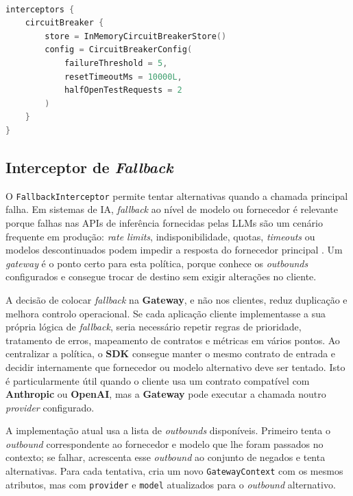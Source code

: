     \vspace{0.5em}
    \begin{lstlisting}[language=kotlin, caption={DSL de configuração do \textit{interceptor} de \textit{circuit breaker}}]

interceptors {
    circuitBreaker {
        store = InMemoryCircuitBreakerStore()
        config = CircuitBreakerConfig(
            failureThreshold = 5,
            resetTimeoutMs = 10000L,
            halfOpenTestRequests = 2
        )
    }
}
    \end{lstlisting}

    \subsection{Interceptor de \textit{Fallback}}
    O \texttt{FallbackInterceptor} permite tentar alternativas quando a chamada principal falha. Em sistemas de IA, \textit{fallback} ao nível de modelo ou fornecedor é relevante porque falhas nas APIs de inferência fornecidas pelas LLMs são um cenário frequente em produção: \textit{rate limits}, indisponibilidade, quotas, \textit{timeouts} ou modelos descontinuados podem impedir a resposta do fornecedor principal \cite{ai_fallback_tombas,portkey_fallback}. Um \textit{gateway} é o ponto certo para esta política, porque conhece os \textit{outbounds} configurados e consegue trocar de destino sem exigir alterações no cliente.

    A decisão de colocar \textit{fallback} na \textbf{Gateway}, e não nos clientes, reduz duplicação e melhora controlo operacional. Se cada aplicação cliente implementasse a sua própria lógica de \textit{fallback}, seria necessário repetir regras de prioridade, tratamento de erros, mapeamento de contratos e métricas em vários pontos. Ao centralizar a política, o \textbf{SDK} consegue manter o mesmo contrato de entrada e decidir internamente que fornecedor ou modelo alternativo deve ser tentado. Isto é particularmente útil quando o cliente usa um contrato compatível com \textbf{Anthropic} ou \textbf{OpenAI}, mas a \textbf{Gateway} pode executar a chamada noutro \textit{provider} configurado.

    A implementação atual usa a lista de \textit{outbounds} disponíveis. Primeiro tenta o \textit{outbound} correspondente ao fornecedor e modelo que lhe foram passados no contexto; se falhar, acrescenta esse \textit{outbound} ao conjunto de negados e tenta alternativas. Para cada tentativa, cria um novo \texttt{GatewayContext} com os mesmos atributos, mas com \texttt{provider} e \texttt{model} atualizados para o \textit{outbound} alternativo.

